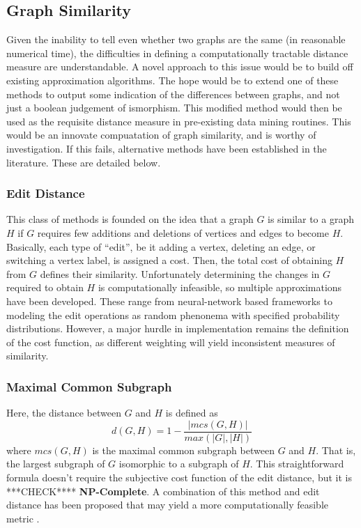 \documentclass[11pt]{article}
\begin{document}
\subsection{Graph Similarity}
\indent Given the inability to tell even whether two graphs are the same (in reasonable numerical time), the difficulties in defining a computationally tractable distance measure are understandable. A novel approach to this issue would be to build off existing approximation algorithms. The hope would be to extend one of these methods to output some indication of the differences between graphs, and not just a boolean judgement of ismorphism. This modified method would then be used as the requisite distance measure in pre-existing data mining routines. This would be an innovate compuatation of graph similarity, and is worthy of investigation. If this fails, alternative methods have been established in the literature. These are detailed below.
\subsubsection{Edit Distance}
\indent This class of methods is founded on the idea that a graph $G$ is similar to a graph $H$ if $G$ requires few additions and deletions of vertices and edges to become $H$. Basically, each type of ``edit'', be it adding a vertex, deleting an edge, or switching a vertex label, is assigned a cost. Then, the total cost of obtaining $H$ from $G$ defines their similarity. Unfortunately determining the changes in $G$ required to obtain $H$ is computationally infeasible, so multiple approximations have been developed. These range from neural-network based frameworks to modeling the edit operations as random phenonema with specified probability distributions. However, a major hurdle in implementation remains the definition of the cost function, as different weighting will yield inconsistent measures of similarity.
\subsubsection{Maximal Common Subgraph}
\indent Here, the distance between $G$ and $H$ is defined as
\[
d(G,H) = 1 - \frac{|mcs(G, H)|}{max(|G|,|H|)}
\]
where $mcs(G,H)$ is the maximal common subgraph between $G$ and $H$. That is, the largest subgraph of $G$ isomorphic to a subgraph of $H$. This straightforward formula doesn't require the subjective cost function of the edit distance, but it is ***CHECK**** \textbf{NP-Complete}. A combination of this method and edit distance has been proposed that may yield a more computationally feasible metric \cite{LookInSurveyPaper}.
\end{document}
